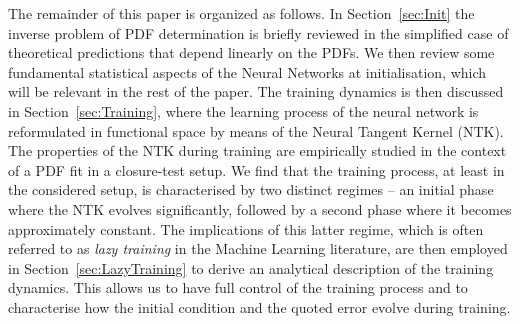 The remainder of this paper is organized as follows. In Section~\ref{sec:Init}
the inverse problem of PDF determination is briefly reviewed in the simplified
case of theoretical predictions that depend linearly on the PDFs. We then review
some fundamental statistical aspects of the Neural Networks at initialisation,
which will be relevant in the rest of the paper. The training dynamics is then
discussed in Section~\ref{sec:Training}, where the learning process of the
neural network is reformulated in functional space by means of the Neural
Tangent Kernel (NTK). The properties of the NTK during training are empirically
studied in the context of a PDF fit in a closure-test setup. We find that the
training process, at least in the considered setup, is characterised by two
distinct regimes -- an initial phase where the NTK evolves significantly,
followed by a second phase where it becomes approximately constant. The
implications of this latter regime, which is often referred to as \textit{lazy
training} in the Machine Learning literature, are then employed in
Section~\ref{sec:LazyTraining} to derive an analytical description of the
training dynamics. This allows us to have full control of the training process
and to characterise how the initial condition and the quoted error evolve during
training.
